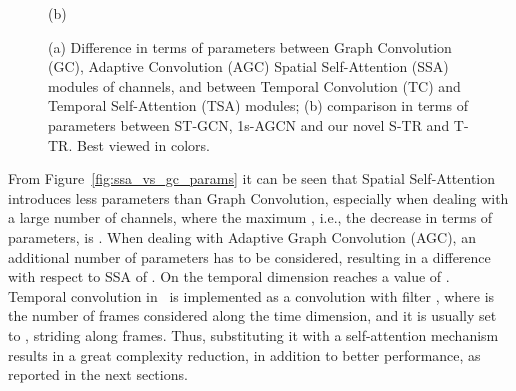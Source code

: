 \documentclass[review]{cvpr}
\begin{document}
\begin{figure}[t]
\begin{center}
\begin{minipage}{.94\linewidth}
{{}
  \label{fig:nets_params}
  }
\end{minipage}
\begin{minipage}[t]{.05\linewidth}{\small (b)}\end{minipage}
\end{center}

\caption{(a) Difference in terms of parameters between Graph Convolution (GC), Adaptive Convolution (AGC) Spatial Self-Attention (SSA) modules of  channels, and between Temporal Convolution (TC) and Temporal Self-Attention (TSA) modules; (b) comparison in terms of parameters between ST-GCN, 1s-AGCN and our novel S-TR and T-TR. Best viewed in colors.}
\label{fig:ssa_tsa_params}

\end{figure}

From Figure~\ref{fig:ssa_vs_gc_params} it can be seen that Spatial Self-Attention introduces less parameters than Graph Convolution, especially when dealing with a large number of channels, where the maximum , i.e., the decrease in terms of parameters, is . When dealing with Adaptive Graph Convolution (AGC), an additional number of parameters has to be considered, resulting in a difference with respect to SSA of . 
On the temporal dimension  reaches a value of . Temporal convolution in~\cite{yan2018spatial} is implemented as a  convolution with filter , where  is the number of frames considered along the time dimension, and it is usually set to , striding along  frames. Thus, substituting it with a self-attention mechanism results in a great complexity reduction, in addition to better performance, as reported in the next sections. 
\end{document}
